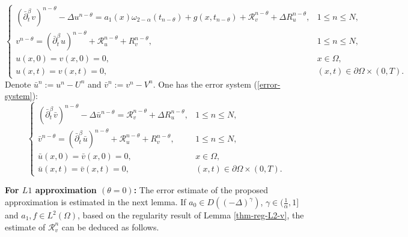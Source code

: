 \documentclass[11pt]{article}
\numberwithin{equation}{section}
\begin{document}
\begin{equation}\nonumber
\begin{cases}
  (\bar\partial_t^\beta v)^{n-\theta} - \Delta u^{n-\theta} = a_1(x)\omega_{2-\alpha}(t_{n-\theta})+g(x,t_{n-\theta})+\mathcal{R}_v^{n-\theta}+\Delta R_u^{n-\theta}, & 1\le n\le N, \\
  v^{n-\theta}  = (\bar\partial_t^\beta u)^{n-\theta} + \mathcal{R}_u^{n-\theta}+R_v^{n-\theta}, & 1\le n\le N, \\
  u(x,0) = v(x,0)=0, & x \in \Omega, \\
  u(x,t) = v(x,t)=0, & (x,t) \in \partial \Omega \times (0,T).
\end{cases}
\end{equation}
Denote $\bar u^n:=u^n-U^n$ and $\bar v^n:=v^n-V^n$. One has the error system (\ref{error-system}):
\begin{equation}\label{error-system}
\begin{cases}
  (\bar\partial_t^\beta \bar v)^{n-\theta} - \Delta \bar u^{n-\theta} = \mathcal{R}_v^{n-\theta}+\Delta R_u^{n-\theta}, & 1\le n\le N, \\
  \bar v^{n-\theta}  = (\bar\partial_t^\beta \bar u)^{n-\theta} + \mathcal{R}_u^{n-\theta}+R_v^{n-\theta}, & 1\le n\le N, \\
  \bar u(x,0) = \bar v(x,0)=0, & x \in \Omega, \\
  \bar u(x,t) = \bar v(x,t)=0, & (x,t) \in \partial \Omega \times (0,T).
\end{cases}
\end{equation}

\textbf{For $L1$ approximation $(\theta=0)$:} The error estimate of the proposed approximation is estimated in the next lemma.
If $a_0\in D((-\Delta)^{\gamma})$, $\gamma\in(\frac{1}{\alpha},1]$ and $a_1,f\in L^2(\Omega)$, based on the regularity result of Lemma \ref{thm-reg-L2-v}, the estimate of $\mathcal{R}_v^n$ can be deduced as follows.
\end{document}
